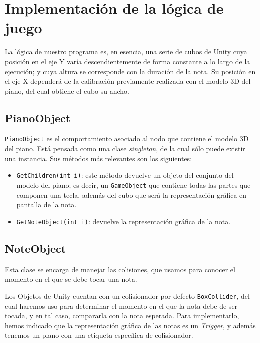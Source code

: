 \section{Implementación de la lógica de juego}

La lógica de nuestro programa es, en esencia, una serie de cubos de Unity cuya posición en el eje Y varía
descendientemente de forma constante a lo largo de la ejecución; y cuya altura se corresponde con la
duración de la nota. Su posición en el eje X dependerá de la calibración previamente realizada
con el modelo 3D del piano, del cual obtiene el cubo su ancho.

\subsection{PianoObject}
\texttt{PianoObject} es el comportamiento asociado al nodo que contiene el modelo 3D del piano. Está pensada
como una clase \textit{singleton}, de la cual sólo puede existir una instancia. Sus métodos más relevantes son los siguientes:
\begin{itemize}
	\item \texttt{GetChildren(int i)}: este método devuelve un objeto del conjunto del modelo del piano; es decir, 
	un \texttt{GameObject} que contiene todas las partes que componen una tecla, además del cubo que será la representación
	gráfica en pantalla de la nota.

	\item \texttt{GetNoteObject(int i)}: devuelve la representación gráfica de la nota. 
\end{itemize}

\subsection{NoteObject}
Esta clase se encarga de manejar las colisiones, que usamos para conocer el momento en el que se debe tocar una nota. 

Los Objetos de Unity cuentan con un colisionador por defecto \texttt{BoxCollider}, del cual haremos uso para determinar
el momento en el que la nota debe de ser tocada, y en tal caso, compararla con la nota esperada. Para implementarlo, hemos indicado
que la representación gráfica de las notas es un \textit{Trigger}, y además tenemos un plano con una etiqueta específica de colisionador.

